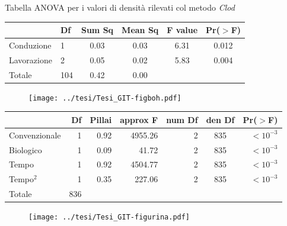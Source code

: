 \documentclass[10pt]{beamer}
\begin{document}
\begin{frame}{Tabella ANOVA per i valori di densità rilevati col metodo \emph{Clod}}
  \begin{table}
    \centering
    \begin{tabular}{llcccc}
      \hline
      & Df & Sum Sq & Mean Sq & F value & Pr($>$F) \\ 
      \hline
      Conduzione & 1 & 0.03 & 0.03 & 6.31 & 0.012 \\ 
      Lavorazione & 2 & 0.05 & 0.02 & 5.83 & 0.004 \\ 
      Totale & 104 & 0.42 & 0.00 &  &  \\ 
      \hline
    \end{tabular}
    \label{tab:Anova densita per spinta}
  \end{table}
\end{frame}

\begin{frame}[label=distribuzione]
  \hyperlink{finale}{}
  \vspace{1.5cm}
  \begin{figure}
    \texttt{[image: ../tesi/Tesi\_GIT-figboh.pdf]}
  \end{figure}
\end{frame}



\begin{frame}[label=Anova]
  \hyperlink{Composizionale}{}
  \footnotesize
  \begin{table}
    \centering
    \begin{tabular}{lrrrrcr}
      \hline
      & Df & Pillai & approx F & num Df & den Df & Pr($>$F) \\ 
      \hline
      Convenzionale & 1 & 0.92 & 4955.26 & 2 & 835 & $<10^{-3}$ \\ 
      Biologico  & 1 & 0.09 & 41.72 & 2 & 835 &  $<10^{-3}$ \\ 
      Tempo & 1 & 0.92 & 4504.77 & 2 & 835 &  $<10^{-3}$  \\ 
      Tempo$^2$& 1 & 0.35 & 227.06 & 2 & 835 &  $<10^{-3}$ \\ 
      Totale & 836 &  &  &  &  &  \\ 
      \hline
    \end{tabular}
  \end{table}
\end{frame}

\begin{frame}[label=Porosimetria]
  \hyperlink{finale}{}
  \vspace{1.5cm}
  \begin{figure}
    \texttt{[image: ../tesi/Tesi\_GIT-figurina.pdf]}
  \end{figure}
\end{frame}
\end{document}
